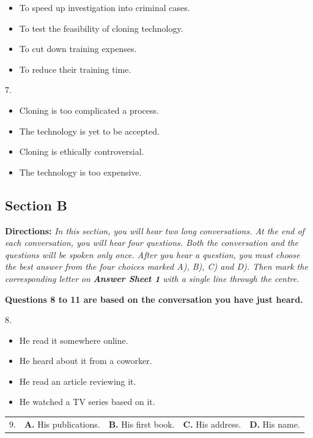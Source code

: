 \documentclass[UTF8,11pt]{ctexart}
\begin{document}
\begin{itemize}[leftmargin=2em,itemsep=.2em,topsep=.4em]\item[A.] To speed up investigation into criminal cases.
\item[B.] To test the feasibility of cloning technology.
\item[C.] To cut down training expenses.
\item[D.] To reduce their training time.
\end{itemize}

7.


\begin{itemize}[leftmargin=2em,itemsep=.2em,topsep=.4em]\item[A.] Cloning is too complicated a process.
\item[B.] The technology is yet to be accepted.
\item[C.] Cloning is ethically controversial.
\item[D.] The technology is too expensive.
\end{itemize}

\subsection*{\textbf{Section B}}


\textbf{Directions:} \textit{In this section, you will hear two long conversations. At the end of each conversation, you will hear} \textit{four questions. Both the conversation and the questions will be spoken only once. After you hear a question, you} \textit{must choose the best answer from the four choices marked A), B), C) and D). Then mark the corresponding letter} \textit{on }\textbf{\textit{Answer Sheet 1}}\textit{ with a single line through the centre.}


\textbf{Questions 8 to 11 are based on the conversation you have just heard.}


8.


\begin{itemize}[leftmargin=2em,itemsep=.2em,topsep=.4em]\item[A.] He read it somewhere online.
\item[B.] He heard about it from a coworker.
\item[C.] He read an article reviewing it.
\item[D.] He watched a TV series based on it.
\end{itemize}

\noindent\begin{tabularx}{\linewidth}{@{}lXXXX@{}}9. & \textbf{A.} His publications. & \textbf{B.} His first book. & \textbf{C.} His address. & \textbf{D.} His name.\\\end{tabularx}\par
\end{document}
